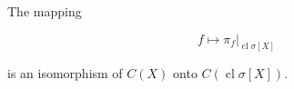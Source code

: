 The mapping

$$f \mapsto \pi_f \big|_{\operatorname{cl} \sigma[X]}$$

is an isomorphism of $C(X)$ onto $C(\operatorname{cl} \sigma[X])$.
